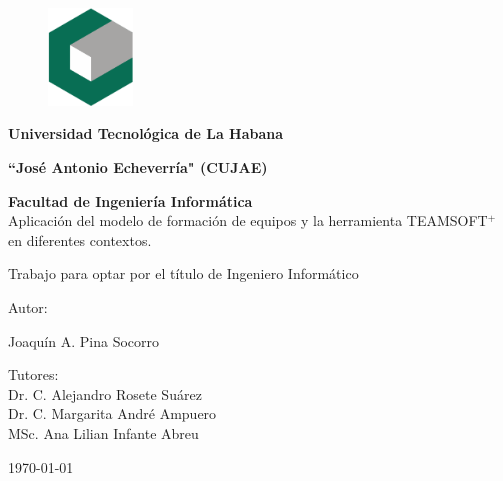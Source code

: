 \begin{figure}
	\centering
	\includegraphics[width=0.2\textwidth]{figuras/cujae.eps}
\end{figure}
\vspace{3cm}	
\begin{center}
	\Large{\textbf{Universidad Tecnológica de La Habana}}
	
	\Large{\textbf{“José Antonio Echeverría" (CUJAE)}}
	
	\Large{\textbf{
			Facultad de Ingeniería Informática}}\\
	
	\vspace{1.3cm}
	\LARGE{Aplicación del modelo de formación de equipos y la herramienta TEAMSOFT$^+$ en diferentes contextos.}
	\vspace{1cm}
	
	\normalsize
	{\large		
	Trabajo para optar por el título de Ingeniero Informático
	}
	\vspace{1cm}
	
	\large{
	Autor: 
	
	Joaquín A. Pina Socorro
	\vspace{0.5cm}
	
	Tutores:\\
	Dr. C. Alejandro Rosete Suárez\\
	Dr. C. Margarita André Ampuero\\
	MSc. Ana Lilian Infante Abreu
}
	
	
	\vspace{2cm}
	
	\small{\mifecha\today}
	
\end{center}	


